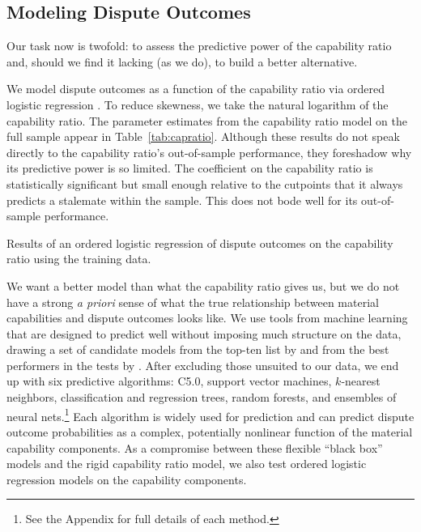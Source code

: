 \subsection{Modeling Dispute Outcomes}

Our task now is twofold: to assess the predictive power of the capability ratio and, should we find it lacking (as we do), to build a better alternative.

We model dispute outcomes as a function of the capability ratio via ordered logistic regression \citep{McKelvey:2010gv}.
To reduce skewness, we take the natural logarithm of the capability ratio.
The parameter estimates from the capability ratio model on the full sample appear in Table~\ref{tab:capratio}.
Although these results do not speak directly to the capability ratio's out-of-sample performance, they foreshadow why its predictive power is so limited.
The coefficient on the capability ratio is statistically significant but small enough relative to the cutpoints that it always predicts a stalemate within the sample.
This does not bode well for its out-of-sample performance.

\begin{table}[tp]
  \centering
  
  \caption{
    Results of an ordered logistic regression of dispute outcomes on the capability ratio using the training data.
  }
  \label{tab:capratio}
\end{table}

We want a better model than what the capability ratio gives us, but we do not have a strong \emph{a priori} sense of what the true relationship between material capabilities and dispute outcomes looks like.
We use tools from machine learning that are designed to predict well without imposing much structure on the data, drawing a set of candidate models from the top-ten list by \citet{Wu:2007ev} and from the best performers in the tests by \citet{FernandezDelgado:2014ul}.
After excluding those unsuited to our data, we end up with six predictive algorithms: C5.0, support vector machines, $k$-nearest neighbors, classification and regression trees, random forests, and ensembles of neural nets.\footnote{%
  See the Appendix for full details of each method.
}
Each algorithm is widely used for prediction and can predict dispute outcome probabilities as a complex, potentially nonlinear function of the material capability components.
As a compromise between these flexible ``black box'' models and the rigid capability ratio model, we also test ordered logistic regression models on the capability components.

